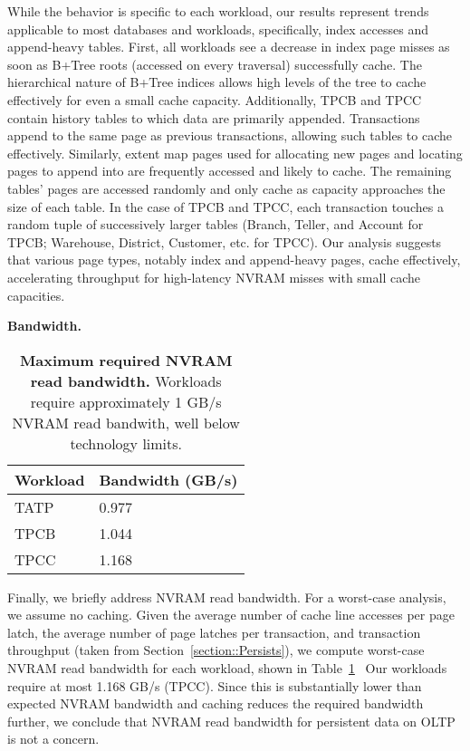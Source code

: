 While the behavior is specific to each workload, our results represent trends applicable to most databases and workloads, specifically, index accesses and append-heavy tables.
First, all workloads see a decrease in index page misses as soon as B+Tree roots (accessed on every traversal) successfully cache.
The hierarchical nature of B+Tree indices allows high levels of the tree to cache effectively for even a small cache capacity.
Additionally, TPCB and TPCC contain history tables to which data are primarily appended.
Transactions append to the same page as previous transactions, allowing such tables to cache effectively.
Similarly, extent map pages used for allocating new pages and locating pages to append into are frequently accessed and likely to cache.
The remaining tables' pages are accessed randomly and only cache as capacity approaches the size of each table.
In the case of TPCB and TPCC, each transaction touches a random tuple of successively larger tables (Branch, Teller, and Account for TPCB; Warehouse, District, Customer, etc. for TPCC).
Our analysis suggests that various page types, notably index and append-heavy pages, cache effectively, accelerating throughput for high-latency NVRAM misses with small cache capacities.

\textbf{Bandwidth.}
\begin{table}
  \centering
  \begin{tabular}{l l}
    \hline
    Workload & Bandwidth (GB/s) \\
    \hline \hline
    TATP & 0.977 \\
    TPCB & 1.044 \\
    TPCC & 1.168 \\
    \hline
  \end{tabular}
  \caption{\textbf{Maximum required NVRAM read bandwidth.} Workloads require approximately 1 GB/s NVRAM read bandwith, well below technology limits.}
  \label{table::ReadBandwidth}
\end{table}

Finally, we briefly address NVRAM read bandwidth.
For a worst-case analysis, we assume no caching.
Given the average number of cache line accesses per page latch, the average number of page latches per transaction, and transaction throughput (taken from Section~\ref{section::Persists}), we compute worst-case NVRAM read bandwidth for each workload, shown in Table~\ref{table::ReadBandwidth}~
Our workloads require at most 1.168 GB/s (TPCC).
Since this is substantially lower than expected NVRAM bandwidth and caching reduces the required bandwidth further, we conclude that NVRAM read bandwidth for persistent data on OLTP is not a concern.

